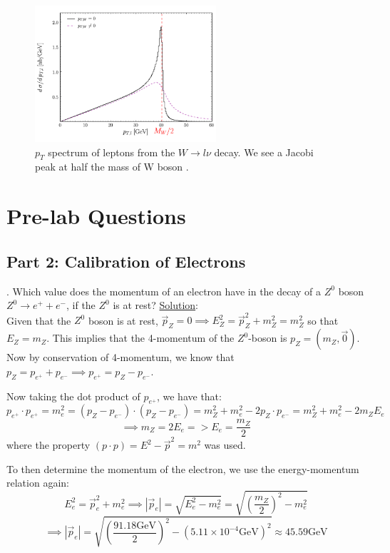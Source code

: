 \documentclass[a4paper]{report}
\numberwithin{equation}{section}
\begin{document}
\begin{figure}[htpb]
    \centering
    \includegraphics[width=0.6\textwidth]{jacobi}
    \caption{$p_T$ spectrum of leptons from the $W \rightarrow l \nu$ decay. We see a Jacobi peak at half the mass of W boson \cite{jacobi}.}
    \label{fig:jacobi}
\end{figure}


\chapter{Pre-lab Questions} \label{chap:prelab}

\section{Part 2: Calibration of Electrons}

. Which value does the momentum of an electron have in the decay of a $Z^0$ boson $Z^0 \rightarrow e^+ + e^-$, if the $Z^0$ is at rest? 
\bigbreak
\noindent \underline{Solution}: \\
\noindent Given that the $Z^0$ boson is at rest, $\vec{p}_Z = 0 \implies E_Z^2 = \vec{p}_Z^2 + m_Z^2 = m_Z^2$ so that $E_Z = m_Z$. This implies that the 4-momentum of the $Z^0$-boson is $p_Z = (m_Z, \vec{0})$. 
\noindent Now by conservation of 4-momentum, we know that $p_Z = p_{e^+} + p_{e^-} \implies p_{e^+} = p_Z - p_{e^-}$. 

\noindent Now taking the dot product of $p_{e^+}$, we have that:
$$
p_{e^+} \cdot p_{e^+} = m_e^2 = (p_Z - p_{e^-}) \cdot (p_Z - p_{e^-}) = m_Z^2 + m_e^2 - 2 p_Z \cdot p_{e^-} = m_Z^2 + m_e^2 - 2m_Z E_e
$$
$$
\implies m_Z = 2E_e => E_e = \frac{m_Z}{2}
$$
\noindent where the property $(p \cdot p) = E^2 - \vec{p}^2 = m^2$ was used. 

\noindent To then determine the momentum of the electron, we use the energy-momentum relation again:
$$E_e^2 = \vec{p}_e^2 + m_e^2 \implies |\vec{p}_e| = \sqrt{E_e^2 - m_e^2} = \sqrt{\left(\frac{m_Z}{2}\right)^2- m_e^2}$$
$$\implies |\vec{p}_e| = \sqrt{\left(\frac{91.18 \text{GeV} }{2}\right)^2 - (5.11 \times 10^{-4} \text{GeV})^2} \approx 45.59 \text{GeV}$$
\end{document}
